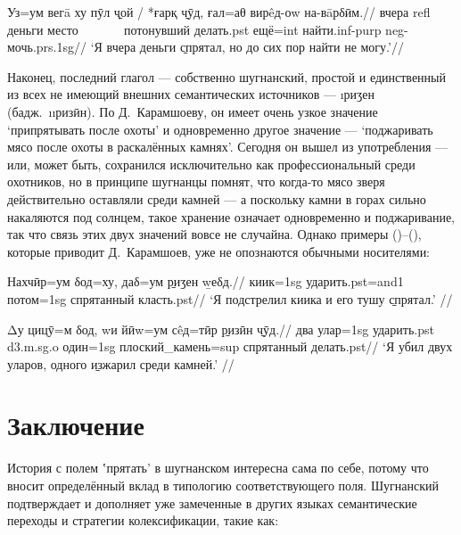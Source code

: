 \begingl
\gla Уз=ум вегā ху пӯл \b{ҷой} / *ғарқ \b{чӯд}, ғал=аθ вирêд-оw на-вāрδӣм.//
 вчера {\sc refl} деньги место ~~~~~~ потонувший делать.{\sc pst} ещё={\sc int} найти.{\sc inf-purp} {\sc neg}-мочь.{\sc prs.1sg}//
\glft ‘Я вчера деньги \b{спрятал}, но до сих пор найти не могу.’//
\endgl \xe

Наконец, последний глагол — собственно шугнанский, простой и единственный из всех не имеющий внешних семантических источников — \i{риӡен} (бадж.~\i{\i{ризӣн}}). По Д.~Карамшоеву, он имеет очень узкое значение ‘припрятывать после охоты’ и одновременно другое значение — ‘поджаривать мясо после охоты в раскалённых камнях’. Сегодня он вышел из употребления — или, может быть, сохранился исключительно как профессиональный среди охотников, но в принципе шугнанцы помнят, что когда-то мясо зверя действительно оставляли среди камней — а поскольку камни в горах сильно накаляются под солнцем, такое хранение означает одновременно и поджаривание, так что связь этих двух значений вовсе не случайна. Однако примеры ()–(), которые приводит Д.~Карамшоев, уже не опознаются обычными носителями:

\begingl
\gla Нахчӣр=ум δод=ху, даδ=ум \b{риӡен} \b{wеδд}.//
\glc киик={\sc 1sg} ударить.{\sc pst=and1} потом={\sc 1sg} спрятанный класть.{\sc pst}//
\glft ‘Я подстрелил киика и его тушу \b{спрятал}.’ //
\endgl \xe

\begingl
\gla Δу цицӯ=м δод, wи йӣw=ум сêд=тӣр \b{ризӣн} \b{чӯд}.//
\glc два улар={\sc 1sg} ударить.{\sc pst} {\sc d3.m.sg.o} один={\sc 1sg} плоский\_камень={\sc sup} спрятанный делать.{\sc pst}//
\glft ‘Я убил двух уларов, одного \b{изжарил} среди камней.’ //
\endgl \xe

\section{Заключение} \label{hide-conclusion}

История с полем ʽпрятать’ в шугнанском интересна сама по себе, потому что вносит определённый вклад в типологию соответствующего поля. Шугнанский подтверждает и дополняет уже замеченные в других языках семантические переходы и стратегии колексификации, такие как:

